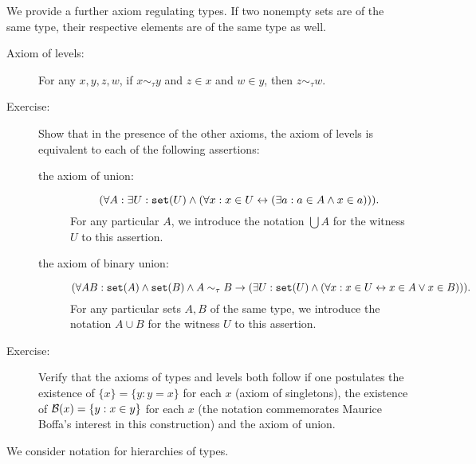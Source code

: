\documentclass[12pt]{book}
\begin{document}
We provide a further axiom regulating types.  If two nonempty sets are of the same type, their respective elements are of the same type as well.

\begin{description}

\item[Axiom of levels:]  For any $x,y,z,w$, if $x \sim_\tau y$ and $z \in x$ and $w \in y$, then $z \sim_\tau w$.

\item[Exercise:]  Show that in the presence of the other axioms, the axiom of levels is equivalent to each of the following assertions:

\begin{description}

\item  [the axiom of union:]  $$(\forall A:\exists U:{\tt set}(U) \wedge (\forall x:x \in U \leftrightarrow (\exists a:a \in A \wedge x \in a))).$$  For any particular $A$, we introduce the notation $\bigcup A$ for the witness $U$ to this assertion.

\item[the axiom of binary union:]  $$(\forall AB: {\tt set}(A) \wedge {\tt set}(B) \wedge A \sim_\tau B \rightarrow (\exists U:{\tt set}(U) \wedge (\forall x:x \in U \leftrightarrow x \in A \vee x \in B))).$$  For any particular sets $A,B$ of the same type, we introduce the notation $A \cup B$ for the witness $U$ to this assertion.

\end{description}

\item[Exercise:]  Verify that the axioms of types and levels both follow if one postulates the existence of $\{x\} = \{y:y=x\}$ for each $x$ (axiom of singletons), the existence of
${\cal B}(x) = \{y:x\in y\}$ for each $x$ (the notation commemorates Maurice Boffa's interest in this construction) and the axiom of union.

\end{description}

We consider notation for hierarchies of types.
\end{document}
